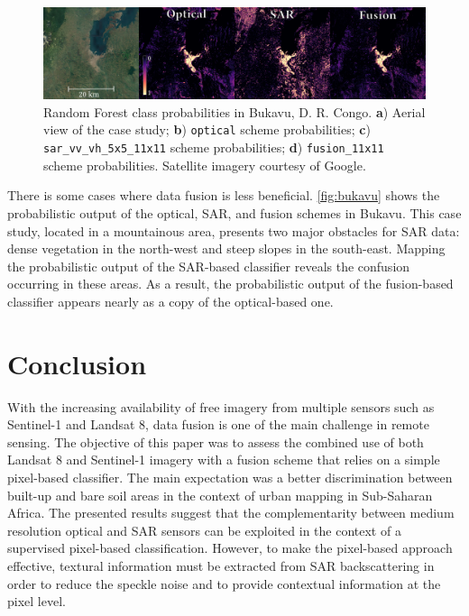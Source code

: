 \documentclass[remotesensing,article,submit,moreauthors,pdftex,10pt,a4paper]{Definitions/mdpi}
\begin{document}
\begin{figure}[H]
    \centering
    \includegraphics[width=\textwidth]{figures/bukavu.png}
    \caption{Random Forest class probabilities in Bukavu, D. R. Congo.
    \textbf{a}) Aerial view of the case study; \textbf{b}) \texttt{optical}
    scheme probabilities; \textbf{c}) \texttt{sar\_vv\_vh\_5x5\_11x11}
    scheme probabilities; \textbf{d}) \texttt{fusion\_11x11} scheme
    probabilities. Satellite imagery courtesy of Google.}
    \label{fig:bukavu}
\end{figure}

There is some cases where data fusion is less beneficial. \autoref{fig:bukavu}
shows the probabilistic output of the optical, SAR, and fusion schemes in
Bukavu. This case study, located in a mountainous area, presents two major
obstacles for SAR data: dense vegetation in the north-west and steep slopes in
the south-east. Mapping the probabilistic output of the SAR-based classifier
reveals the confusion occurring in these areas. As a result, the probabilistic
output of the fusion-based classifier appears nearly as a copy of the
optical-based one.

\section{Conclusion}

With the increasing availability of free imagery from multiple sensors such as
Sentinel-1 and Landsat 8, data fusion is one of the main challenge in remote
sensing. The objective of this paper was to assess the combined use of both
Landsat 8 and Sentinel-1 imagery with a fusion scheme that relies on a simple
pixel-based classifier. The main expectation was a better discrimination between
built-up and bare soil areas in the context of urban mapping in Sub-Saharan
Africa. The presented results suggest that the complementarity between medium
resolution optical and SAR sensors can be exploited in the context of a
supervised pixel-based classification. However, to make the pixel-based approach
effective, textural information must be extracted from SAR backscattering in
order to reduce the speckle noise and to provide contextual information at the
pixel level.
\end{document}
